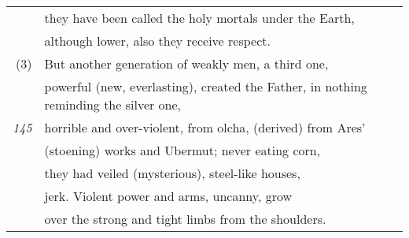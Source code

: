 \begin{tabular}[hb]{rl}
& they have been called the holy mortals under the Earth, \\
& although lower, also they receive respect. \\
(3) & But another generation of weakly men, a third one, \\
& powerful (new, everlasting), created the Father, in nothing reminding the 
   silver one, \\
\footnotesize{\em 145}& horrible and over-violent, from olcha, (derived) from Ares' \\
& (stoening) works and Ubermut; never eating corn, \\
& they had veiled (mysterious), steel-like houses, \\
& jerk. Violent power and arms, uncanny, grow \\
& over the strong and tight limbs from the shoulders. 
\end{tabular}

